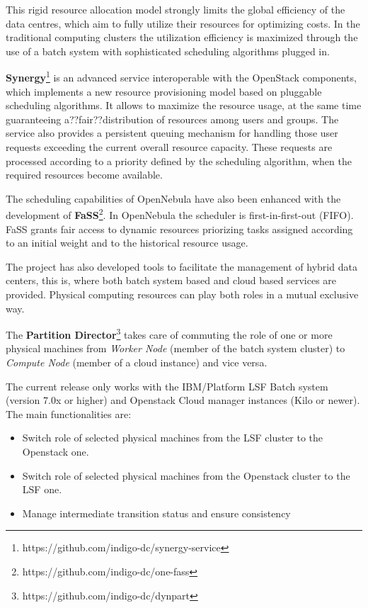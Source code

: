 \documentclass{article}
\begin{document}
This rigid resource allocation model strongly limits the global efficiency of the data centres, which aim to fully utilize their resources for optimizing costs. In the traditional computing clusters the utilization efficiency is maximized through the use of a batch system with sophisticated scheduling algorithms plugged in.

{\bf Synergy}\footnote{https://github.com/indigo-dc/synergy-service} is an advanced service interoperable with the OpenStack components, which implements a new resource provisioning model based on pluggable scheduling algorithms. It allows to maximize the resource usage, at the same time guaranteeing a??fair??distribution of resources among users and groups. The service also provides a persistent queuing mechanism for handling those user requests exceeding the current overall resource capacity. These requests are processed according to a priority defined by the scheduling algorithm, when the required resources become available.

The scheduling capabilities of OpenNebula have also been enhanced with the development of {\bf FaSS}\footnote{https://github.com/indigo-dc/one-fass}. In OpenNebula the scheduler is first-in-first-out (FIFO). FaSS grants fair access to dynamic resources priorizing tasks assigned according to an initial weight and to the historical resource usage.

The project has also developed tools to facilitate the management of hybrid data centers, this is, where both batch system based and cloud based services are 
provided. Physical computing resources can play both roles in a mutual exclusive way.

The {\bf Partition Director}\footnote{https://github.com/indigo-dc/dynpart} takes care of commuting the role of one or more physical machines from {\sl Worker Node} (member of the batch system cluster) to {\sl Compute Node} (member of a cloud instance) and vice versa.

The current release only works with the IBM/Platform LSF Batch system (version 7.0x or higher) and Openstack Cloud manager instances (Kilo or newer).
The main functionalities are:

\begin{itemize}
\item Switch role of selected physical machines from the LSF cluster to the Openstack one.
\item Switch role of selected physical machines from the Openstack cluster to the LSF one.
\item Manage intermediate transition status and ensure consistency
\end{itemize}
\end{document}
